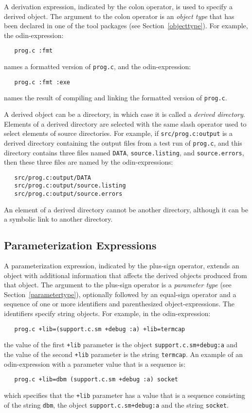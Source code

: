 \documentclass[hidelinks]{report}
\newcommand{\ex}{\tt}   %
\begin{document}
A derivation expression, indicated by the colon operator,
is used to specify a derived object.
The argument to the colon operator is an {\em object type}
that has been declared in one of the tool packages
(see Section~\ref{objecttype}).
For example, the odin-expression:
\begin{verbatim}
   prog.c :fmt
\end{verbatim}
names a formatted version of {\ex prog.c}, and the odin-expression:
\begin{verbatim}
   prog.c :fmt :exe
\end{verbatim} 
names the result of compiling and linking
the formatted version of {\ex prog.c}.

A derived object can be a directory,
in which case it is called a {\em derived directory}.
Elements of a derived directory are selected with the
same slash operator used to select elements of source directories.
For example, if {\ex src/prog.c:output} is a derived directory
containing the output files from a test run of {\ex prog.c},
and this directory contains three files named
{\ex DATA}, {\ex source.listing}, and {\ex source.errors},
then these three files are named by the odin-expressions:
\begin{verbatim}
   src/prog.c:output/DATA
   src/prog.c:output/source.listing
   src/prog.c:output/source.errors
\end{verbatim}
An element of a derived directory cannot be another directory,
although it can be a symbolic link to another directory.

\subsection{Parameterization Expressions}

A parameterization expression, indicated by the plus-sign operator,
extends an object with additional information
that affects the derived objects produced from that object.
The argument to the plus-sign operator is a {\em parameter type}
(see Section~\ref{parametertype}),
optionally followed by an equal-sign operator and a sequence of 
one or more identifiers and parenthesized object-expressions.
The identifiers specify string objects.
For example, in the odin-expression:
\begin{verbatim}
   prog.c +lib=(support.c.sm +debug :a) +lib=termcap
\end{verbatim}
the value of the first {\ex +lib} parameter
is the object {\ex support.c.sm+debug:a}
and the value of the second {\ex +lib} parameter
is the string {\ex termcap}.
An example of an odin-expression with a parameter value that is a sequence is:
\begin{verbatim}
   prog.c +lib=dbm (support.c.sm +debug :a) socket
\end{verbatim}
which specifies that the {\ex +lib} parameter has a value that is
a sequence consisting of the string {\ex dbm},
the object {\ex support.c.sm+debug:a} and the string {\ex socket}.
\end{document}
